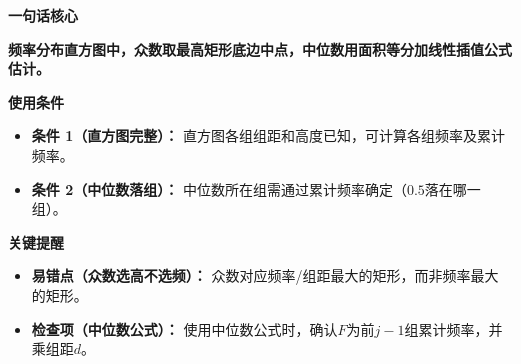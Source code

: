 \begin{summarybox}
	\textbf{\textcolor{CSummary}{一句话核心}}

	\textbf{频率分布直方图中，众数取最高矩形底边中点，中位数用面积等分加线性插值公式估计。}

	\medskip
	\textbf{\textcolor{CSummary}{使用条件}}
	\begin{itemize}[leftmargin=*, itemsep=0.5em, topsep=0.4em]
		\item \textbf{条件 1（直方图完整）：} 直方图各组组距和高度已知，可计算各组频率及累计频率。
		\item \textbf{条件 2（中位数落组）：} 中位数所在组需通过累计频率确定（$0.5$落在哪一组）。
	\end{itemize}

	\medskip
	\textbf{\textcolor{CSummary}{关键提醒}}
	\begin{itemize}[leftmargin=*, itemsep=0.5em, topsep=0.4em]
		\item \textbf{易错点（众数选高不选频）：} 众数对应频率/组距最大的矩形，而非频率最大的矩形。
		\item \textbf{检查项（中位数公式）：} 使用中位数公式时，确认$F$为前$j-1$组累计频率，并乘组距$d$。
	\end{itemize}
\end{summarybox}
